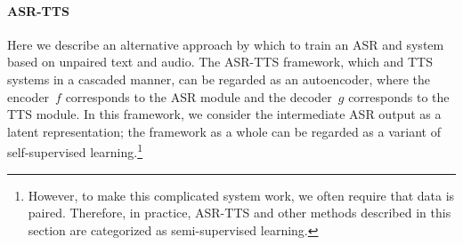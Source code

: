 

\paragraph{ASR-TTS}
Here we describe an alternative approach by which to train an ASR and  system
based on unpaired text and audio. The ASR-TTS framework, which  and
TTS systems in a cascaded manner,
can be regarded as an autoencoder, where the encoder~$f$
corresponds to the ASR module and the decoder~$g$ corresponds to the TTS module.
In this framework, we consider the intermediate ASR output as a latent
representation; the framework as a whole can be regarded as a variant of
self-supervised learning.\footnote{However, to make this complicated
system work, we often require that data is paired. Therefore, in practice,
ASR-TTS and other methods described in this section are categorized as
semi-supervised learning.}

